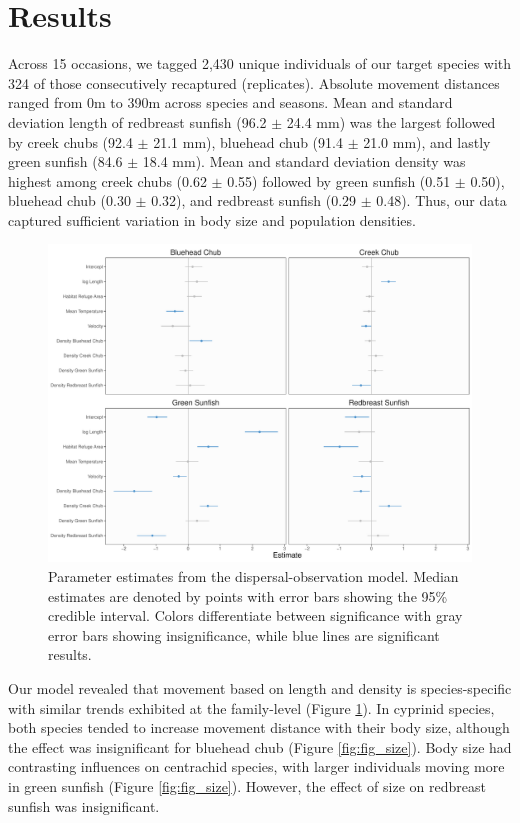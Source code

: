 \documentclass[11pt, class=article, crop=false]{standalone}
\begin{document}
\section{Results}

Across 15 occasions, we tagged 2,430 unique individuals of our target species with 324 of those consecutively recaptured (replicates). Absolute movement distances ranged from 0m to 390m across species and seasons. Mean and standard deviation length of redbreast sunfish (96.2 $\pm$ 24.4 mm) was the largest followed by creek chubs (92.4 $\pm$ 21.1 mm), bluehead chub (91.4 $\pm$ 21.0 mm), and lastly green sunfish (84.6 $\pm$ 18.4 mm). Mean and standard deviation density was highest among creek chubs (0.62 $\pm$ 0.55) followed by green sunfish (0.51 $\pm$ 0.50), bluehead chub (0.30 $\pm$ 0.32), and redbreast sunfish (0.29 $\pm$ 0.48). Thus, our data captured sufficient variation in body size and population densities. 
\begin{figure}
    \centering
    \includegraphics[width=0.8\linewidth]{output/fig_est.pdf}
    \caption{Parameter estimates from the dispersal-observation model. Median estimates are denoted by points with error bars showing the 95\% credible interval. Colors differentiate between significance with gray error bars showing insignificance, while blue lines are significant results.}
    \label{fig:fig_est}
\end{figure}
Our model revealed that movement based on length and density is species-specific with similar trends exhibited at the family-level (Figure \ref{fig:fig_est}). In cyprinid species, both species tended to increase movement distance with their body size, although the effect was insignificant for bluehead chub (Figure \ref{fig:fig_size}). Body size had contrasting influences on centrachid species, with larger individuals moving more in green sunfish (Figure \ref{fig:fig_size}). However, the effect of size on redbreast sunfish was insignificant.
\end{document}
